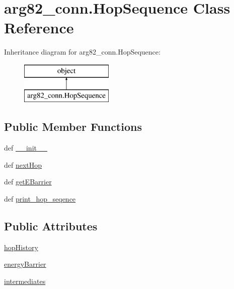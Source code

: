 \hypertarget{classarg82__conn_1_1_hop_sequence}{\section{arg82\-\_\-conn.\-Hop\-Sequence Class Reference}
\label{classarg82__conn_1_1_hop_sequence}
}
Inheritance diagram for arg82\-\_\-conn.\-Hop\-Sequence\-:\begin{figure}[H]
\begin{center}
\leavevmode
\includegraphics[height=2.000000cm]{classarg82__conn_1_1_hop_sequence}
\end{center}
\end{figure}
\subsection*{Public Member Functions}
\begin{DoxyCompactItemize}
\item 
def \hyperlink{classarg82__conn_1_1_hop_sequence_a3a1a8ee47d2b03b06d9c9fed487efa58}{\-\_\-\-\_\-init\-\_\-\-\_\-}
\item 
def \hyperlink{classarg82__conn_1_1_hop_sequence_af732d313e1d5ad598f0f8c33fba47228}{next\-Hop}
\item 
def \hyperlink{classarg82__conn_1_1_hop_sequence_a1716c182c8f86d1bb0efebbae5ccf849}{get\-E\-Barrier}
\item 
def \hyperlink{classarg82__conn_1_1_hop_sequence_a9f9bcf9ec05ac7136486ab61295be473}{print\-\_\-hop\-\_\-seqence}
\end{DoxyCompactItemize}
\subsection*{Public Attributes}
\begin{DoxyCompactItemize}
\item 
\hyperlink{classarg82__conn_1_1_hop_sequence_a149f553cca0c3ec0daa468c380abbf15}{hop\-History}
\item 
\hyperlink{classarg82__conn_1_1_hop_sequence_aae8e47b85c84f16fb9290a3bfe8f9d40}{energy\-Barrier}
\item 
\hyperlink{classarg82__conn_1_1_hop_sequence_a7012ed813fa548f9cc38ffd6ef1c8a8f}{intermediates}
\end{DoxyCompactItemize}
